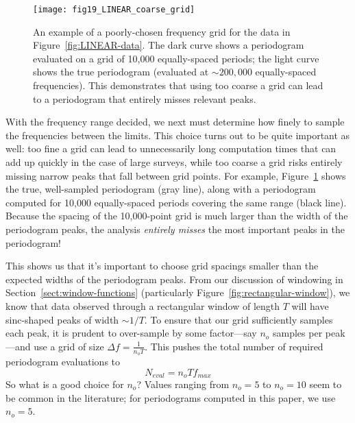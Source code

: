 \documentclass[preprint]{aastex}
\newcommand{\fig}[1]{Figure~\ref{fig:#1}}
\newcommand{\figlabel}[1]{\label{fig:#1}}
\newcommand{\eqlabel}[1]{\label{eq:#1}}
\newcommand{\Sect}[1]{Section~\ref{sect:#1}}
\newcommand{\sect}[1]{\Sect{#1}}
\begin{document}
\begin{figure}[ht]
  \centering
  \texttt{[image: fig19\_LINEAR\_coarse\_grid]}
  \caption{An example of a poorly-chosen frequency grid for the data in
    \fig{LINEAR-data}. The dark curve shows a periodogram evaluated on a
    grid of 10,000 equally-spaced periods; the light curve shows the true
    periodogram (evaluated at ${\sim}200,000$ equally-spaced frequencies).
    This demonstrates that using too coarse a grid can lead to a periodogram
    that entirely misses relevant peaks.
    \figlabel{LINEAR-coarse-grid}}
\end{figure}

With the frequency range decided, we next must determine how finely to sample
the frequencies between the limits.
This choice turns out to be quite important as well: too fine a grid can
lead to unnecessarily long computation times that can add up quickly in the
case of large surveys, while too coarse a grid risks
entirely missing narrow peaks that fall between grid points.
For example, \fig{LINEAR-coarse-grid} shows the true, well-sampled periodogram
(gray line), along with a periodogram computed for 10,000 equally-spaced
periods covering the same range (black line).
Because the spacing of the 10,000-point grid is much larger than the width of
the periodogram peaks, the analysis {\it entirely misses} the most
important peaks in the periodogram!

This shows us that it's important to choose grid spacings smaller than the
expected widths of the periodogram peaks.
From our discussion of windowing in \sect{window-functions}
(particularly \fig{rectangular-window}), we know that data observed through a
rectangular window of length $T$ will have sinc-shaped peaks of width
${\sim}1/T$.
To ensure that our grid sufficiently samples each peak, it is prudent to
over-sample by some factor---say $n_o$ samples per peak---and
use a grid of size $\Delta f = \frac{1}{n_o T}$.
This pushes the total number of required periodogram evaluations to
\begin{equation}
  \eqlabel{n-eval}
  N_{eval} = n_o T f_{max}
\end{equation}
So what is a good choice for $n_o$?
Values ranging from $n_o=5$ \citep{Schwarzenberg-Czerny96, VanderPlas2015}
to $n_o=10$ \citep{Debosscher07, Richards12}
seem to be common in the literature;
for periodograms computed in this paper, we use $n_o=5$.
\end{document}
